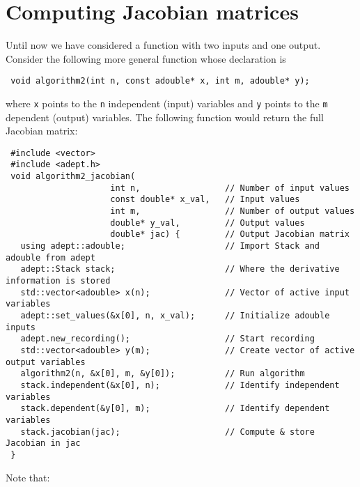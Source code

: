 \documentclass[a4,oneside]{book}
\def\codesize{\small}
\def\code#1{{\codesize\texttt{#1}}}
\begin{document}
\section{Computing Jacobian matrices}
\label{sec:jacobian}
Until now we have considered a function with two inputs and one
output.  Consider the following more general function whose declaration
is
\begin{lstlisting}
 void algorithm2(int n, const adouble* x, int m, adouble* y);
\end{lstlisting}
where \code{x} points to the \code{n} independent (input) variables
and \code{y} points to the \code{m} dependent (output) variables. The
following function would return the full Jacobian matrix:
%
\begin{lstlisting}
 #include <vector>
 #include <adept.h>
 void algorithm2_jacobian(
                     int n,                 // Number of input values
                     const double* x_val,   // Input values
                     int m,                 // Number of output values
                     double* y_val,         // Output values
                     double* jac) {         // Output Jacobian matrix
   using adept::adouble;                    // Import Stack and adouble from adept
   adept::Stack stack;                      // Where the derivative information is stored
   std::vector<adouble> x(n);               // Vector of active input variables
   adept::set_values(&x[0], n, x_val);      // Initialize adouble inputs
   adept.new_recording();                   // Start recording
   std::vector<adouble> y(m);               // Create vector of active output variables
   algorithm2(n, &x[0], m, &y[0]);          // Run algorithm
   stack.independent(&x[0], n);             // Identify independent variables
   stack.dependent(&y[0], m);               // Identify dependent variables
   stack.jacobian(jac);                     // Compute & store Jacobian in jac
 }
\end{lstlisting}
%
Note that:
\end{document}
